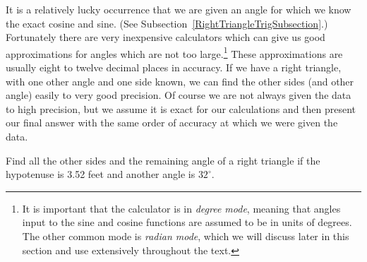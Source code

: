 It is a relatively lucky occurrence that we are given an
angle for which we know the exact cosine and sine.
(See Subsection~\ref{RightTriangleTrigSubsection}.)
Fortunately there are very inexpensive calculators which
can give us good approximations for angles which are not
too large.\footnote{%
It is important that the calculator is in {\it degree mode},
meaning that angles input to the sine and cosine functions
are assumed to be in units of degrees.  The other common
mode is {\it radian mode}, which we will discuss later in 
this section and use extensively throughout the text.}
  These approximations are usually eight to twelve
decimal places in accuracy.  If we have a right triangle,
with one other angle and one side known, we can find the
other sides (and other angle) easily to very good precision.
Of course we are not always given the data to high precision,
but we assume it is exact for our calculations and then
present our final answer with the same order of accuracy
at which we were given the data.

\bex Find all the other sides and the remaining angle 
of a right triangle if the hypotenuse is 3.52 feet and
another angle is $32^\circ$.


